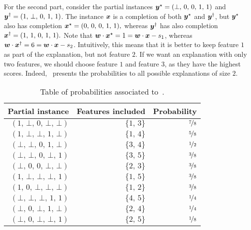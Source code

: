 \begin{example}
For the second part, consider the partial instances ${\bm{y}}^{\star} = (\bot, \, 0, \, 0, \, 1, \, 1)$ and ${\bm{y}}^{\dagger} = (1, \, \bot, \, 0, \, 1, \, 1)$. The instance ${\bm{x}}$ is a completion of both ${\bm{y}}^{\star}$ and ${\bm{y}}^{\dagger}$, but ${\bm{y}}^{\star}$ also has completion 
\(
    {\bm{x}}^{\star} = (0, \, 0, \, 0, \, 1, \, 1),
\)
whereas ${\bm{y}}^{\dagger}$ has also completion 
\(
    {\bm{x}}^{\dagger} = (1, \, 1, \, 0, \, 1, \, 1).
\)
Note that ${\bm{w}} \cdot  {\bm{x}}^{\star} = 1 = {\bm{w}} \cdot {\bm{x}} - s_1$, whereas ${\bm{w}} \cdot  {\bm{x}}^{\dagger} = 6 = {\bm{w}} \cdot {\bm{x}} - s_2$. Intuitively, this means that it is better to keep feature $1$ as part of the explanation, but not feature $2$. If we want an explanation with only two features, we should choose feature $1$ and feature $3$, as they have the highest scores. Indeed,~ presents the probabilities to all possible explanations of size $2$.
\begin{table}
    \centering
    \begin{tabular}{rrr}
        \toprule
        Partial instance & Features included & Probability\\ \midrule 
    $(1, \,\bot, \,0, \,\bot, \,\bot)$ & $\{1, \,3\}$ & $\nicefrac{ 7 }{ 8 }$\\
    $(1, \,\bot, \,\bot, \,1, \,\bot)$ & $\{1, \,4\}$ & $\nicefrac{ 5 }{ 8 }$\\
    $(\bot, \,\bot, \,0, \,1, \,\bot)$ & $\{3, \,4\}$ & $\nicefrac{ 1 }{ 2 }$\\
    $(\bot, \,\bot, \,0, \,\bot, \,1)$ & $\{3, \,5\}$ & $\nicefrac{ 3 }{ 8 }$\\
    $(\bot, \,0, \,0, \,\bot, \,\bot)$ & $\{2, \,3\}$ & $\nicefrac{ 3 }{ 8 }$\\
    $(1, \,\bot, \,\bot, \,\bot, \,1)$ & $\{1, \,5\}$ & $\nicefrac{ 3 }{ 8 }$\\
    $(1, \,0, \,\bot, \,\bot, \,\bot)$ & $\{1, \,2\}$ & $\nicefrac{ 3 }{ 8 }$\\
    $(\bot, \,\bot, \,\bot, \,1, \,1)$ & $\{4, \,5\}$ & $\nicefrac{ 1 }{ 4 }$\\
    $(\bot, \,0, \,\bot, \,1, \,\bot)$ & $\{2, \,4\}$ & $\nicefrac{ 1 }{ 4 }$\\
    $(\bot, \,0, \,\bot, \,\bot, \,1)$ & $\{2, \,5\}$ & $\nicefrac{ 1 }{ 8 }$\\
        \bottomrule
    \end{tabular}
    \caption{Table of probabilities associated to~.}\label{table:ex-greedy2}
\end{table}
\begin{table}

\end{table}
\end{example}
